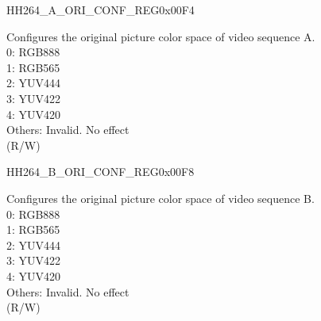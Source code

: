 \begin{register}{H}{H264\_A\_ORI\_CONF\_REG}{0x00F4}\label{regdesc:H264AORICONFREG}
%
%
\regnewline%
\begin{regdesc}\begin{reglist}
\label{fielddesc:H264AORICOLORSPACE}\item [H264\_A\_ORI\_COLOR\_SPACE] Configures the original picture color space of video sequence A.\\0: RGB888\\1: RGB565\\2: YUV444\\3: YUV422\\4: YUV420\\Others: Invalid. No effect\\(R/W)
\end{reglist}\end{regdesc}
\end{register}


\begin{register}{H}{H264\_B\_ORI\_CONF\_REG}{0x00F8}\label{regdesc:H264BORICONFREG}
%
%
\regnewline%
\begin{regdesc}\begin{reglist}
\label{fielddesc:H264BORICOLORSPACE}\item [H264\_B\_ORI\_COLOR\_SPACE] Configures the original picture color space of video sequence B.\\0: RGB888\\1: RGB565\\2: YUV444\\3: YUV422\\4: YUV420\\Others: Invalid. No effect\\(R/W)
\end{reglist}\end{regdesc}
\end{register}


